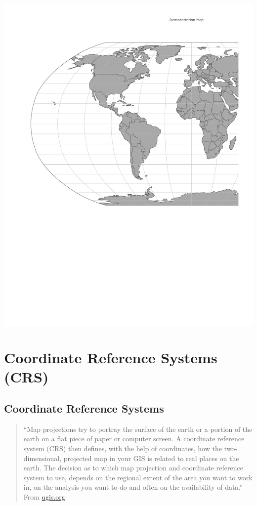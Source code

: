 \documentclass[
  letterpaper,
  DIV=11,
  numbers=noendperiod,
  oneside]{scrreprt}
\begin{document}
\includegraphics{projections_files/figure-pdf/unnamed-chunk-8-1.pdf}

\chapter{Coordinate Reference Systems
(CRS)}\label{coordinate-reference-systems-crs}

\section{Coordinate Reference
Systems}\label{coordinate-reference-systems}

\begin{quote}
``Map projections try to portray the surface of the earth or a portion
of the earth on a flat piece of paper or computer screen. A coordinate
reference system (CRS) then defines, with the help of coordinates, how
the two-dimensional, projected map in your GIS is related to real places
on the earth. The decision as to which map projection and coordinate
reference system to use, depends on the regional extent of the area you
want to work in, on the analysis you want to do and often on the
availability of data.'' From
\href{https://docs.qgis.org/2.8/en/docs/gentle_gis_introduction/coordinate_reference_systems.html}{qgis.org}
\end{quote}
\end{document}
